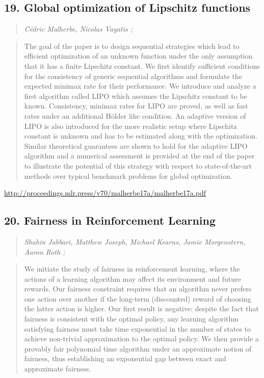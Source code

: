 \documentclass{article}
\begin{document}
\subsection{19. Global optimization of Lipschitz functions}

\begin{quote}
\footnotesize{\textit{Cédric Malherbe, Nicolas Vayatis ;}}
\end{quote}

\begin{quote}
    The goal of the paper is to design sequential strategies which lead to efficient optimization of an unknown function under the only assumption that it has a finite Lipschitz constant. We first identify sufficient conditions for the consistency of generic sequential algorithms and formulate the expected minimax rate for their performance. We introduce and analyze a first algorithm called LIPO which assumes the Lipschitz constant to be known. Consistency, minimax rates for LIPO are proved, as well as fast rates under an additional Hölder like condition. An adaptive version of LIPO is also introduced for the more realistic setup where Lipschitz constant is unknown and has to be estimated along with the optimization. Similar theoretical guarantees are shown to hold for the adaptive LIPO algorithm and a numerical assessment is provided at the end of the paper to illustrate the potential of this strategy with respect to state-of-the-art methods over typical benchmark problems for global optimization.  \end{quote}

\href{http://proceedings.mlr.press/v70/malherbe17a/malherbe17a.pdf}{http://proceedings.mlr.press/v70/malherbe17a/malherbe17a.pdf}

\subsection{20. Fairness in Reinforcement Learning}

\begin{quote}
\footnotesize{\textit{Shahin Jabbari, Matthew Joseph, Michael Kearns, Jamie Morgenstern, Aaron Roth ;}}
\end{quote}

\begin{quote}
    We initiate the study of fairness in reinforcement learning, where the actions of a learning algorithm may affect its environment and future rewards. Our fairness constraint requires that an algorithm never prefers one action over another if the long-term (discounted) reward of choosing the latter action is higher. Our first result is negative: despite the fact that fairness is consistent with the optimal policy, any learning algorithm satisfying fairness must take time exponential in the number of states to achieve non-trivial approximation to the optimal policy. We then provide a provably fair polynomial time algorithm under an approximate notion of fairness, thus establishing an exponential gap between exact and approximate fairness.  \end{quote}
\end{document}
